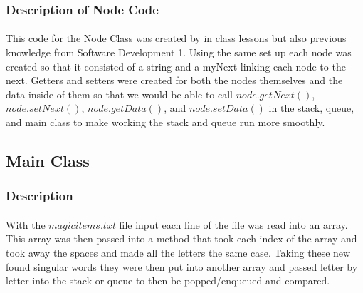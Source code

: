 \documentclass[letterpaper, 10pt,DIV=13]{scrartcl}
\numberwithin{equation}{section} %
\numberwithin{figure}{section} %
\numberwithin{table}{section} %
\begin{document}
\subsubsection{Description of Node Code}
\paragraph{} This code for the Node Class was created by in class lessons but also previous knowledge from Software Development 1. Using the same set up each node was created so that it consisted of a string and a myNext linking each node to the next. Getters and setters were created for both the nodes themselves and the data inside of them so that we would be able to call $node.getNext()$, $node.setNext()$, $node.getData()$, and $node.setData()$ in the stack, queue, and main class to make working the stack and queue run more smoothly.

\subsection{Main Class}

\subsubsection{Description}
\paragraph{} With the $magicitems.txt$ file input each line of the file was read into an array. This array was then passed into a method that took each index of the array and took away the spaces and made all the letters the same case. Taking these new found singular words they were then put into another array and passed letter by letter into the stack or queue to then be popped/enqueued and compared.
\end{document}
